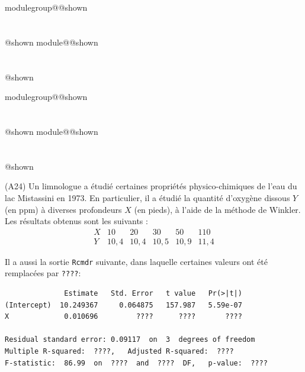 \documentclass{Evaluation}
\makeatletter
\newcommand{\currentmodulekey}{}
\newcommand{\currentmoduletitle}{}
\newcommand{\currentgroupkey}{}
\newcommand{\currentgrouptitle}{}
\newcommand{\showmoduleifneeded}{%
  \ifx\currentgroupkey\empty\else
    \expandafter\ifx\csname modulegroup@\currentgroupkey @shown\endcsname\relax
      \section*{\currentgrouptitle}%
      \expandafter\gdef\csname modulegroup@\currentgroupkey @shown\endcsname{1}%
    \fi
  \fi
  \expandafter\ifx\csname module@\currentmodulekey @shown\endcsname\relax
    \section*{\currentmoduletitle}%
    \expandafter\gdef\csname module@\currentmodulekey @shown\endcsname{1}%
  \fi
}
\newenvironment{H24}{\showmoduleifneeded}{}
\newenvironment{A24}{\showmoduleifneeded}{}
\makeatother
\begin{document}
\begin{questions}
\begin{H24}
\begin{parts}
\end{parts}
\end{H24}

\begin{A24}
\question (A24)
Un limnologue a étudié certaines propriétés physico-chimiques de l'eau du lac Mistassini en 1973. En particulier, il a étudié la quantité d'oxygène dissous $Y$ (en ppm) à diverses profondeurs $X$ (en pieds), à l'aide de la méthode de Winkler. Les résultats obtenus sont les suivants :
$$
\begin{array}{c|ccccc}
X & 10 & 20 & 30 & 50 & 110   \\  \hline
Y & 10,4 & 10,4 & 10,5 & 10,9 & 11,4
\end{array}
$$

Il a aussi la sortie \texttt{Rcmdr} suivante, dans laquelle certaines valeurs ont été remplacées par \texttt{????}:
\begin{verbatim}
              Estimate   Std. Error   t value   Pr(>|t|)    
(Intercept)  10.249367     0.064875   157.987   5.59e-07 
X             0.010696         ????      ????       ????   

Residual standard error: 0.09117  on  3  degrees of freedom
Multiple R-squared:  ????,	 Adjusted R-squared:  ???? 
F-statistic:  86.99  on  ????  and  ????  DF,   p-value:  ????
\end{verbatim}

\end{A24}
\end{questions}
\end{document}
